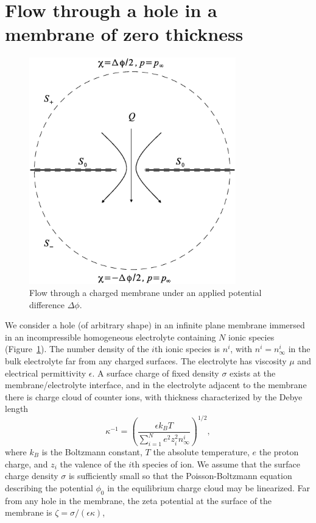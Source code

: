 \section{Flow through a hole in a membrane of zero thickness}
\label{sec:zeroThick}
\begin{figure}[h]
\centering
\includegraphics[width=0.8\textwidth]{zero_thickness/figure1.eps}
\caption{Flow through a charged membrane under an applied potential difference $\Delta\phi$.}
\label{fig:sketch}
\end{figure}
We consider a hole (of arbitrary shape) in an infinite plane membrane immersed in an incompressible homogeneous electrolyte containing $N$ ionic species (Figure~\ref{fig:sketch}). The number density of the $i$th ionic species is $n^i$, with $n^i=n_\infty^i$ in the bulk electrolyte far from any charged surfaces. The electrolyte has viscosity $\mu$ and electrical permittivity $\epsilon$. A surface charge of fixed density $\sigma$ exists at the membrane/electrolyte interface, and in the electrolyte adjacent to the membrane there is charge cloud of counter ions, with thickness characterized by the Debye length
\begin{equation}
\kappa^{-1}=\left(\frac{\epsilon k_BT}{\sum_{i=1}^N e^2 z_i^2n_\infty^i}\right)^{1/2},
\end{equation}
where $k_B$ is the Boltzmann constant, $T$ the absolute temperature, $e$ the proton charge, and $z_i$ the valence of the $i$th species of ion. We assume that the surface charge density $\sigma$ is sufficiently small so that the Poisson-Boltzmann equation describing the potential $\phi_0$ in the equilibrium charge cloud may be linearized. Far from any hole in the membrane, the zeta potential at the surface of the membrane is $\zeta=\sigma/(\epsilon\kappa)$,
